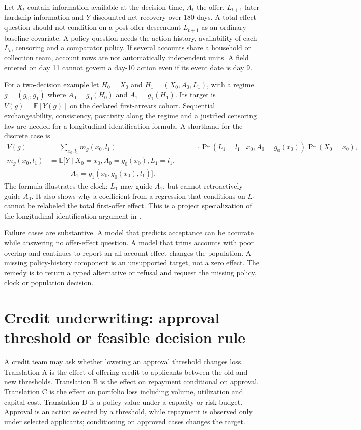 Let $X_t$ contain information available at the decision time, $A_t$ the offer, $L_{t+1}$ later hardship information and $Y$ discounted net recovery over 180 days. A total-effect question should not condition on a post-offer descendant $L_{t+1}$ as an ordinary baseline covariate. A policy question needs the action history, availability of each $L_t$, censoring and a comparator policy. If several accounts share a household or collection team, account rows are not automatically independent units. A field entered on day 11 cannot govern a day-10 action even if its event date is day 9.

For a two-decision example let $H_0=X_0$ and $H_1=(X_0,A_0,L_1)$, with a regime $g=(g_0,g_1)$ where $A_0=g_0(H_0)$ and $A_1=g_1(H_1)$. Its target is $V(g)=\mathbb E[Y(g)]$ on the declared first-arrears cohort. Sequential exchangeability, consistency, positivity along the regime and a justified censoring law are needed for a longitudinal identification formula. A shorthand for the discrete case is
\begin{align*}
 V(g)&=\sum_{x_0,l_1} m_g(x_0,l_1)\,
 &\qquad\cdot\Pr(L_1=l_1\mid x_0,A_0=g_0(x_0))\Pr(X_0=x_0),\\
 m_g(x_0,l_1)&=\mathbb E\bigl[Y\mid X_0=x_0, A_0=g_0(x_0), L_1=l_1,\\
 &\hspace{3em} A_1=g_1(x_0,g_0(x_0),l_1)\bigr].
\end{align*}
The formula illustrates the clock: $L_1$ may guide $A_1$, but cannot retroactively guide $A_0$. It also shows why a coefficient from a regression that conditions on $L_1$ cannot be relabeled the total first-offer effect. This is a project specialization of the longitudinal identification argument in \citet{hernan2020}.

Failure cases are substantive. A model that predicts acceptance can be accurate while answering no offer-effect question. A model that trims accounts with poor overlap and continues to report an all-account effect changes the population. A missing policy-history component is an unsupported target, not a zero effect. The remedy is to return a typed alternative or refusal and request the missing policy, clock or population decision.

\section{Credit underwriting: approval threshold or feasible decision rule}

A credit team may ask whether lowering an approval threshold changes loss. Translation A is the effect of offering credit to applicants between the old and new thresholds. Translation B is the effect on repayment conditional on approval. Translation C is the effect on portfolio loss including volume, utilization and capital cost. Translation D is a policy value under a capacity or risk budget. Approval is an action selected by a threshold, while repayment is observed only under selected applicants; conditioning on approved cases changes the target.

